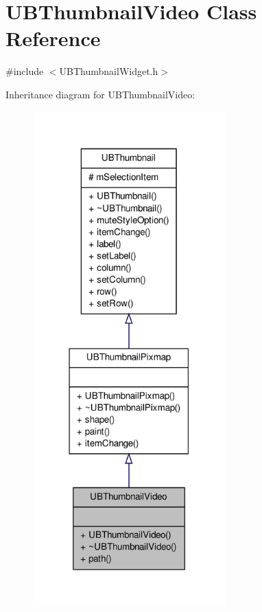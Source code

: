\hypertarget{class_u_b_thumbnail_video}{\section{U\-B\-Thumbnail\-Video Class Reference}
\label{d4/d26/class_u_b_thumbnail_video}
}


{\ttfamily \#include $<$U\-B\-Thumbnail\-Widget.\-h$>$}



Inheritance diagram for U\-B\-Thumbnail\-Video\-:
\nopagebreak
\begin{figure}[H]
\begin{center}
\leavevmode
\includegraphics[width=210pt]{d1/d72/class_u_b_thumbnail_video__inherit__graph}
\end{center}
\end{figure}


